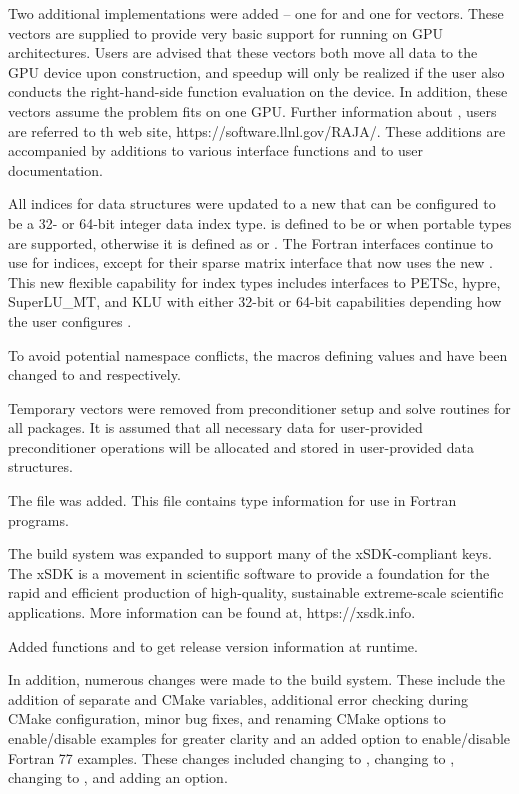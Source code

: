 Two additional {\nvector} implementations were added -- one for
{\cuda} and one for {\raja} vectors.  
These vectors are supplied to provide very basic support for running
on GPU architectures.  Users are advised that these vectors both move all data
to the GPU device upon construction, and speedup will only be realized if the
user also conducts the right-hand-side function evaluation on the device.
In addition, these vectors assume the problem fits on one GPU.
Further information about {\raja}, users are referred to th web site, 
https://software.llnl.gov/RAJA/.
These additions are accompanied by additions to various interface functions
and to user documentation.

All indices for data structures were updated to a new  that
can be configured to be a 32- or 64-bit integer data index type. 
 is defined to be  or  when portable types are
supported, otherwise it is defined as  or .
The Fortran interfaces continue to use  for indices, except for 
their sparse matrix interface that now uses the new .
This new flexible capability for index types includes interfaces to 
PETSc, hypre, SuperLU\_MT, and KLU with 
either 32-bit or 64-bit capabilities depending how the user configures 
{\sundials}.

To avoid potential namespace conflicts, the macros defining 
values  and  have been changed to  and
 respectively.

Temporary vectors were removed from preconditioner setup and solve
routines for all packages.  It is assumed that all necessary data
for user-provided preconditioner operations will be allocated and
stored in user-provided data structures.

The file  was added. This file contains 
{\sundials} type information for use in Fortran programs.

The build system was expanded to support many of the xSDK-compliant keys. 
The xSDK is a movement in scientific software to provide a foundation for the
rapid and efficient production of high-quality, 
sustainable extreme-scale scientific applications.  More information can
be found at, https://xsdk.info.

Added functions  and  to
get {\sundials} release version information at runtime.

In addition, numerous changes were made to the build system.
These include the addition of separate  and  
CMake variables, additional error checking during CMake configuration,
minor bug fixes, and renaming CMake options to enable/disable examples 
for greater clarity and an added option to enable/disable Fortran 77 examples.
These changes included changing  to , 
changing  to , changing  to 
, and adding an  option.

